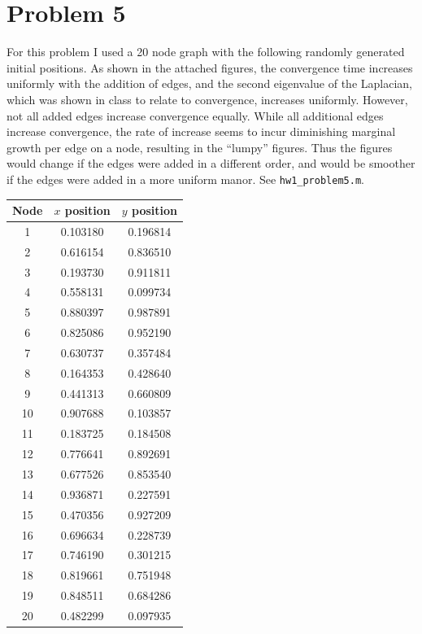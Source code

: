 \documentclass{article}
\begin{document}
\section*{Problem 5}
For this problem I used a 20 node graph with the following randomly generated
initial positions. As shown in the attached figures, the convergence time
increases uniformly with the addition of edges, and the second eigenvalue of the
Laplacian, which was shown in class to relate to convergence, increases
uniformly. However, not all added edges increase convergence equally. While all
additional edges increase convergence, the rate of increase seems to incur
diminishing marginal growth per edge on a node, resulting in the ``lumpy''
figures. Thus the figures would change if the edges were added in a different
order, and would be smoother if the edges were added in a more uniform manor.
See \texttt{hw1\_problem5.m}.

\begin{center}
\begin{tabular}{c|cc}
Node & $x$ position & $y$ position \\\hline
1 & 0.103180 & 0.196814\\
2 & 0.616154 & 0.836510\\
3 & 0.193730 & 0.911811\\
4 & 0.558131 & 0.099734\\
5 & 0.880397 & 0.987891\\
6 & 0.825086 & 0.952190\\
7 & 0.630737 & 0.357484\\
8 & 0.164353 & 0.428640\\
9 & 0.441313 & 0.660809\\
10 & 0.907688 & 0.103857\\
11 & 0.183725 & 0.184508\\
12 & 0.776641 & 0.892691\\
13 & 0.677526 & 0.853540\\
14 & 0.936871 & 0.227591\\
15 & 0.470356 & 0.927209\\
16 & 0.696634 & 0.228739\\
17 & 0.746190 & 0.301215\\
18 & 0.819661 & 0.751948\\
19 & 0.848511 & 0.684286\\
20 & 0.482299 & 0.097935
\end{tabular}
\end{center}
\end{document}
